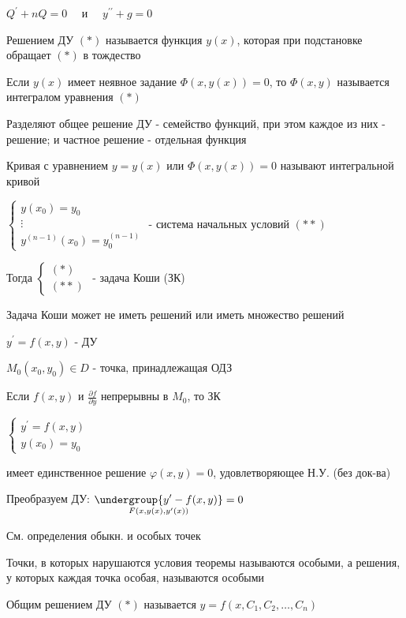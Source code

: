\documentclass[12pt]{article}
\begin{document}
    \Ex $\displaystyle Q^\prime + nQ = 0 \quad$ и $\displaystyle \quad y^{\prime\prime} + g = 0$

     Решением ДУ $(*)$ называется функция $y(x)$, которая при подстановке обращает $(*)$ в тождество

     Если $y(x)$ имеет неявное задание $\Phi(x, y(x)) = 0$, то $\Phi(x, y)$ называется интегралом уравнения $(*)$

    \Nota Разделяют общее решение ДУ - семейство функций, при этом каждое из них - решение; и
    частное решение - отдельная функция

     Кривая с уравнением $y = y(x)$ или $\Phi(x, y(x)) = 0$ называют интегральной кривой

     $\displaystyle \begin{cases}y(x_0) = y_0 \\ \vdots \\ y^{(n - 1)}(x_0) = y_0^{(n - 1)}\end{cases}$ - система начальных условий $(**)$

    Тогда $\begin{cases}(*) \\ (**)\end{cases}$ - задача Коши (ЗК)

    \Nota Задача Коши может не иметь решений или иметь множество решений

    \Th $\displaystyle y^\prime = f(x, y)$ - ДУ

    $\displaystyle M_0(x_0, y_0) \in D$ - точка, принадлежащая ОДЗ

    Если $f(x, y)$ и $\displaystyle \frac{\partial f}{\partial y}$ непрерывны в $\displaystyle M_0$, то ЗК

    $\displaystyle \begin{cases}y^\prime = f(x, y) \\ y(x_0) = y_0\end{cases}$

    имеет единственное решение $\varphi(x, y) = 0$, удовлетворяющее Н.У. (без док-ва)

    \Nota Преобразуем ДУ: $\displaystyle \underset{F(x, y(x), y^\prime(x))}{\undergroup{y^\prime - f(x, y)}} = 0$

    См. определения обыкн. и особых точек

     Точки, в которых нарушаются условия теоремы называются особыми, а решения, у которых каждая точка особая,
    называются особыми

     Общим решением ДУ $(*)$ называется $\displaystyle y = f(x, C_1, C_2, \dots, C_n)$
\end{document}

